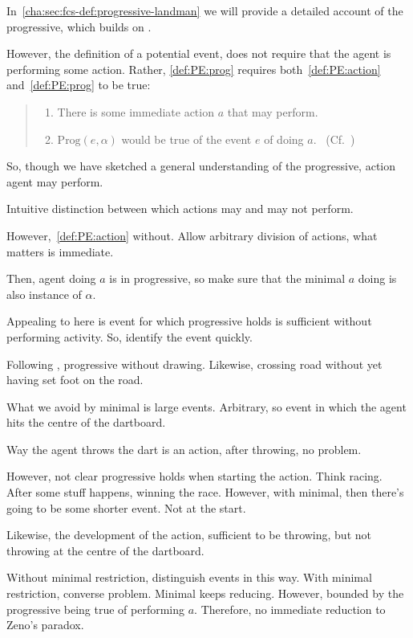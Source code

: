 \begin{note}[Action]
  In~\autoref{cha:sec:fcs-def:progressive-landman} we will provide a detailed account of the progressive, which builds on \textcite{Landman:1992wh}.

  However, the definition of a potential event, does not require that the agent is performing some action.
  Rather, \ref{def:PE:prog} requires both~\ref{def:PE:action} and~\ref{def:PE:prog} to be true:
  \begin{quote}
    \begin{enumerate}[label=\alph*., ref=(\alph*)]
      \item
        There is some immediate action \(a\) that \vAgent{} may perform.
      \item
        \(\text{Prog}(e, \alpha)\) would be true of the event \(e\) of \vAgent{} doing \(a\).\newline
    \mbox{ }\hfill\mbox{(Cf.~)}
  \end{enumerate}
  \vspace{-\baselineskip}
  \end{quote}

  So, though we have sketched a general understanding of the progressive, action agent may perform.

  Intuitive distinction between which actions may and may not perform.

  However,~\ref{def:PE:action} without.
  Allow arbitrary division of actions, what matters is immediate.

  Then, agent doing \(a\) is in progressive, so make sure that the minimal \(a\) doing is also instance of \(\alpha\).

  Appealing to here is event for which progressive holds is sufficient without performing activity.
  So, identify the event quickly.

  Following \citeauthor{Dowty:1979vq}, progressive without drawing.
  Likewise, crossing road without yet having set foot on the road.

  What we avoid by minimal is large events.
  Arbitrary, so event in which the agent hits the centre of the dartboard.

  Way the agent throws the dart is an action, after throwing, no problem.

  However, not clear progressive holds when starting the action.
  Think racing.
  After some stuff happens, winning the race.
  However, with minimal, then there's going to be some shorter event.
  Not at the start.

  Likewise, the development of the action, sufficient to be throwing, but not throwing at the centre of the dartboard.

  Without minimal restriction, distinguish events in this way.
  With minimal restriction, converse problem.
  Minimal keeps reducing.
  However, bounded by the progressive being true of performing \(a\).
  Therefore, no immediate reduction to Zeno's paradox.
\end{note}


